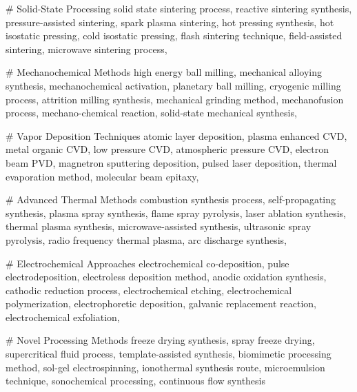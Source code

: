 # Solid-State Processing
solid state sintering process, reactive sintering synthesis,
pressure-assisted sintering, spark plasma sintering,
hot pressing synthesis, hot isostatic pressing,
cold isostatic pressing, flash sintering technique,
field-assisted sintering, microwave sintering process,

# Mechanochemical Methods
high energy ball milling, mechanical alloying synthesis,
mechanochemical activation, planetary ball milling,
cryogenic milling process, attrition milling synthesis,
mechanical grinding method, mechanofusion process,
mechano-chemical reaction, solid-state mechanical synthesis,

# Vapor Deposition Techniques 
atomic layer deposition, plasma enhanced CVD,
metal organic CVD, low pressure CVD,
atmospheric pressure CVD, electron beam PVD,
magnetron sputtering deposition, pulsed laser deposition,
thermal evaporation method, molecular beam epitaxy,

# Advanced Thermal Methods
combustion synthesis process, self-propagating synthesis,
plasma spray synthesis, flame spray pyrolysis,
laser ablation synthesis, thermal plasma synthesis,
microwave-assisted synthesis, ultrasonic spray pyrolysis,
radio frequency thermal plasma, arc discharge synthesis,

# Electrochemical Approaches
electrochemical co-deposition, pulse electrodeposition,
electroless deposition method, anodic oxidation synthesis,
cathodic reduction process, electrochemical etching,
electrochemical polymerization, electrophoretic deposition,
galvanic replacement reaction, electrochemical exfoliation,

# Novel Processing Methods
freeze drying synthesis, spray freeze drying,
supercritical fluid process, template-assisted synthesis,
biomimetic processing method, sol-gel electrospinning,
ionothermal synthesis route, microemulsion technique,
sonochemical processing, continuous flow synthesis
